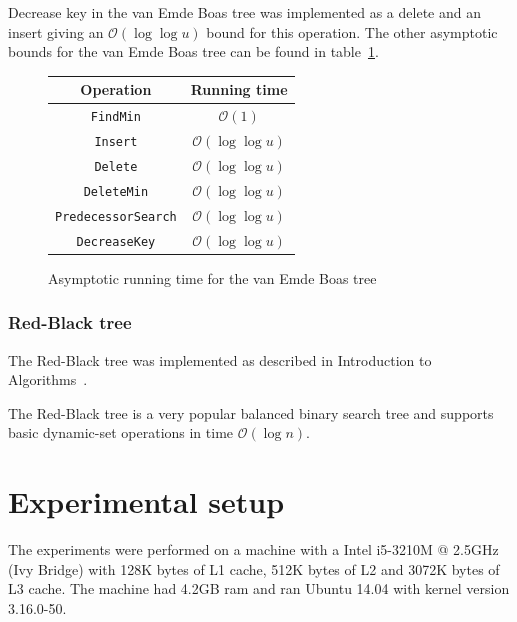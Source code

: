 \documentclass[a4paper,oneside,article,11pt]{memoir}
\begin{document}
Decrease key in the van Emde Boas tree was implemented as a delete and an insert giving an $\mathcal{O}(\log\log u)$ bound for this operation. The other asymptotic bounds for the van Emde Boas tree can be found in table~\ref{tab:van_emde_boas}.
\begin{figure}[H]
\begin{center}
\begin{tabular}{c|c}
Operation & Running time \\\hline
\texttt{FindMin} & $\mathcal{O}(1)$ \\\hline
\texttt{Insert} & $\mathcal{O}(\log\log u)$ \\\hline
\texttt{Delete} & $\mathcal{O}(\log\log u)$ \\\hline
\texttt{DeleteMin} & $\mathcal{O}(\log\log u)$ \\\hline
\texttt{PredecessorSearch} & $\mathcal{O}(\log\log u)$ \\\hline
\texttt{DecreaseKey} & $\mathcal{O}(\log\log u)$
\end{tabular}
\end{center}
\caption{Asymptotic running time for the van Emde Boas tree}
\label{tab:van_emde_boas}
\end{figure}


\subsection{Red-Black tree}
The Red-Black tree was implemented as described in Introduction to Algorithms~\cite{clrs}.

The Red-Black tree is a very popular balanced binary search tree and supports basic dynamic-set operations in time $\mathcal{O}(\log n)$.

\chapter{Experimental setup}
\label{chtp:experiment_setup}

The experiments were performed on a machine with a Intel i5-3210M @ 2.5GHz (Ivy Bridge) with 128K bytes of L1 cache, 512K bytes of L2 and 3072K bytes of L3 cache. The machine had 4.2GB ram and ran Ubuntu 14.04 with kernel version 3.16.0-50.
\end{document}
